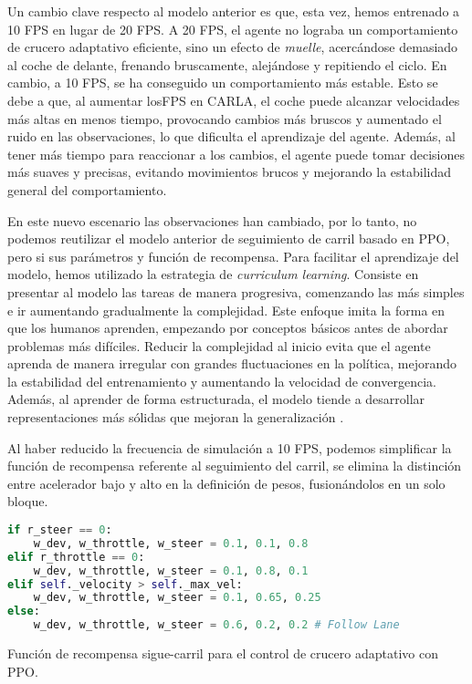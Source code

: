 \newpage

Un cambio clave respecto al modelo anterior es que, esta vez, hemos entrenado a 10 \ac{FPS} en lugar de 20 \ac{FPS}. A 20 \ac{FPS}, el agente no lograba un comportamiento de crucero adaptativo eficiente, sino un efecto de \textit{muelle}, acercándose demasiado al coche de delante, frenando bruscamente, alejándose y repitiendo el ciclo. En cambio, a 10 \ac{FPS}, se ha conseguido un comportamiento más estable. Esto se debe a que, al aumentar los\ac{FPS} en CARLA, el coche puede alcanzar velocidades más altas en menos tiempo, provocando cambios más bruscos y aumentado el ruido en las observaciones, lo que dificulta el aprendizaje del agente. Además, al tener más tiempo para reaccionar a los cambios, el agente puede tomar decisiones más suaves y precisas, evitando movimientos brucos y mejorando la estabilidad general del comportamiento.

En este nuevo escenario las observaciones han cambiado, por lo tanto, no podemos reutilizar el modelo anterior de seguimiento de carril basado en \ac{PPO}, pero si sus parámetros y función de recompensa. Para facilitar el aprendizaje del modelo, hemos utilizado la estrategia de \textit{curriculum learning}. Consiste en presentar al modelo las tareas de manera progresiva, comenzando las más simples e ir aumentando gradualmente la complejidad. Este enfoque imita la forma en que los humanos aprenden, empezando por conceptos básicos antes de abordar problemas más difíciles. Reducir la complejidad al inicio evita que el agente aprenda de manera irregular con grandes fluctuaciones en la política, mejorando la estabilidad del entrenamiento y aumentando la velocidad de convergencia. Además, al aprender de forma estructurada, el modelo tiende a desarrollar representaciones más sólidas que mejoran la generalización \cite{curriculum-learning}.

Al haber reducido la frecuencia de simulación a 10 \ac{FPS}, podemos simplificar la función de recompensa referente al seguimiento del carril, se elimina la distinción entre acelerador bajo y alto en la definición de pesos, fusionándolos en un solo bloque.

\begin{code}[h]
\begin{lstlisting}[language=Python]
if r_steer == 0:
    w_dev, w_throttle, w_steer = 0.1, 0.1, 0.8
elif r_throttle == 0:
    w_dev, w_throttle, w_steer = 0.1, 0.8, 0.1
elif self._velocity > self._max_vel:
    w_dev, w_throttle, w_steer = 0.1, 0.65, 0.25
else:
    w_dev, w_throttle, w_steer = 0.6, 0.2, 0.2 # Follow Lane
\end{lstlisting}
\caption[Función de recompensa sigue-carril para el control de crucero adaptativo con \ac{PPO}]{Función de recompensa sigue-carril para el control de crucero adaptativo  con \ac{PPO}.}
\label{cod:rew_carril_ppo_passing}
\end{code}


